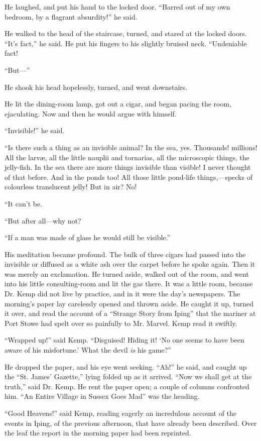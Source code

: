 He laughed, and put his hand to the locked door. “Barred out of my own bedroom, by a flagrant absurdity!” he said.

He walked to the head of the staircase, turned, and stared at the locked doors. “It’s fact,” he said. He put his fingers to his slightly bruised neck. “Undeniable fact!

“But—”

He shook his head hopelessly, turned, and went downstairs.

He lit the dining-room lamp, got out a cigar, and began pacing the room, ejaculating. Now and then he would argue with himself.

“Invisible!” he said.

“Is there such a thing as an invisible animal? In the sea, yes. Thousands! millions! All the larvæ, all the little nauplii and tornarias, all the microscopic things, the jelly-fish. In the sea there are more things invisible than visible! I never thought of that before. And in the ponds too! All those little pond-life things,—specks of colourless translucent jelly! But in air? No!

“It can’t be.

“But after all—why not?

“If a man was made of glass he would still be visible.”

His meditation became profound. The bulk of three cigars had passed into the invisible or diffused as a white ash over the carpet before he spoke again. Then it was merely an exclamation. He turned aside, walked out of the room, and went into his little consulting-room and lit the gas there. It was a little room, because Dr. Kemp did not live by practice, and in it were the day’s newspapers. The morning’s paper lay carelessly opened and thrown aside. He caught it up, turned it over, and read the account of a “Strange Story from Iping” that the mariner at Port Stowe had spelt over so painfully to Mr. Marvel. Kemp read it swiftly.

“Wrapped up!” said Kemp. “Disguised! Hiding it! ‘No one seems to have been aware of his misfortune.’ What the devil \emph{is} his game?”

He dropped the paper, and his eye went seeking. “Ah!” he said, and caught up the “St. James’ Gazette,” lying folded up as it arrived. “Now we shall get at the truth,” said Dr. Kemp. He rent the paper open; a couple of columns confronted him. “An Entire Village in Sussex Goes Mad” was the heading.

“Good Heavens!” said Kemp, reading eagerly an incredulous account of the events in Iping, of the previous afternoon, that have already been described. Over the leaf the report in the morning paper had been reprinted.

